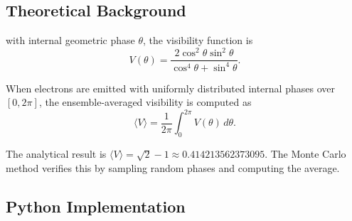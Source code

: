 \documentclass[%
 reprint,
 amsmath,amssymb,
 aps,
 prb,
]{revtex4-2}
\numberwithin{equation}{section}
\begin{document}
\subsection{Theoretical Background} with internal geometric phase $\theta$, the visibility function is
\begin{equation}
V(\theta) = \frac{2\cos^2\theta\sin^2\theta}{\cos^4\theta + \sin^4\theta}.
\label{eq:visibility_function_appendix}
\end{equation}

When electrons are emitted with uniformly distributed internal phases over $[0, 2\pi]$, the ensemble-averaged visibility is computed as
\begin{equation}
\langle V \rangle = \frac{1}{2\pi}\int_0^{2\pi} V(\theta)\,d\theta.
\label{eq:ensemble_average_appendix}
\end{equation}

The analytical result is $\langle V \rangle = \sqrt{2}-1 \approx 0.414213562373095$. The Monte Carlo method verifies this by sampling random phases and computing the average.


\subsection{Python Implementation}
\end{document}
